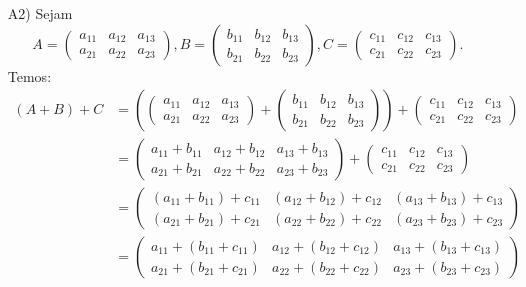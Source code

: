 \begin{exemplo}
\begin{enumerate}[label={\arabic*})]
\begin{solucao}
\begin{itemize}
              \item[A2)] Sejam
                \[
                  A = \begin{pmatrix} a_{11} & a_{12} & a_{13}\\a_{21} & a_{22} & a_{23}\end{pmatrix},
                  B = \begin{pmatrix} b_{11} & b_{12} & b_{13}\\b_{21} & b_{22} & b_{23}\end{pmatrix},
                  C = \begin{pmatrix} c_{11} & c_{12} & c_{13}\\c_{21} & c_{22} & c_{23}\end{pmatrix}.
                \]
                Temos:
                \begin{align*}
                  (A + B) + C & = \left(\begin{pmatrix} a_{11} & a_{12} & a_{13}\\a_{21} & a_{22} & a_{23}\end{pmatrix} +
                  \begin{pmatrix} b_{11} & b_{12} & b_{13}\\b_{21} & b_{22} & b_{23}\end{pmatrix}\right) +
                  \begin{pmatrix} c_{11} & c_{12} & c_{13}\\c_{21} & c_{22} & c_{23}\end{pmatrix}
                  \\ &= \begin{pmatrix} a_{11} + b_{11} & a_{12} + b_{12} & a_{13} + b_{13}\\a_{21} + b_{21} & a_{22} + b_{22} & a_{23} + b_{23}\end{pmatrix} +
                  \begin{pmatrix} c_{11} & c_{12} & c_{13}\\c_{21} & c_{22} & c_{23}\end{pmatrix}
                  \\ &= \begin{pmatrix} (a_{11} + b_{11}) + c_{11} & (a_{12} + b_{12}) + c_{12} & (a_{13} + b_{13}) + c_{13}\\(a_{21} + b_{21}) + c_{21} & (a_{22} + b_{22}) + c_{22} & (a_{23} + b_{23}) + c_{23}\end{pmatrix}
                  \\ &= \begin{pmatrix} a_{11} + (b_{11} + c_{11}) & a_{12} + (b_{12} + c_{12}) & a_{13} + (b_{13} + c_{13})\\a_{21} + (b_{21} + c_{21}) & a_{22} + (b_{22} + c_{22}) & a_{23} + (b_{23} + c_{23})\end{pmatrix}

\end{align*}
\end{itemize}
\end{solucao}
\end{enumerate}
\end{exemplo}
